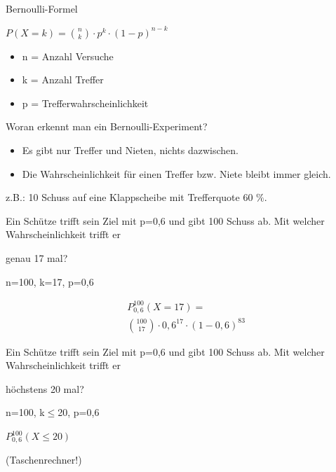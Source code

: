 \documentclass[paper=a6,landscape,ngerman,twoside=true,fontsize=12pt]{scrartcl}
\begin{document}
\begin{frage}
	Bernoulli-Formel
	
\end{frage}
\begin{antwort}
	\LARGE
	$P(X=k)=\binom{n}{k} \cdot p^k \cdot (1-p)^{n-k}$
	\large
	\begin{itemize}
		\item n = Anzahl Versuche
		\item k = Anzahl Treffer
		\item p = Trefferwahrscheinlichkeit
	\end{itemize}	
\end{antwort}
\begin{frage}
	Woran erkennt man ein Bernoulli-Experiment?
	
\end{frage}
\begin{antwort}
	\begin{itemize}
		\item Es gibt nur Treffer und Nieten, nichts dazwischen.
		\item Die Wahrscheinlichkeit für einen Treffer bzw. Niete bleibt immer gleich.
	\end{itemize}
	
	z.B.: 10 Schuss auf eine Klappscheibe mit Trefferquote 60 $\%$.
\end{antwort}
\begin{frage}
	\large
	Ein Schütze trifft sein Ziel mit p=0,6 und gibt 100 Schuss ab. Mit welcher Wahrscheinlichkeit trifft er 
	
	\LARGE 
	genau 17 mal?
	
\end{frage}
\begin{antwort}
	n=100, k=17, p=0,6
	
	\bigskip
	\begin{align*}
	&P^{100}_{0,6}(X=17)= 
	\\&\binom{100}{17} \cdot 0,6^{17}
	\cdot (1-0,6)^{83}
	\end{align*}
	
\end{antwort}
\begin{frage}
	\large
	Ein Schütze trifft sein Ziel mit p=0,6 und gibt 100 Schuss ab. Mit welcher Wahrscheinlichkeit trifft er 
	
	\LARGE 
	höchstens 20 mal?
	
\end{frage}
\begin{antwort}
	n=100, k$\leq$20, p=0,6
	
	\bigskip
	$P^{100}_{0,6}(X\leq 20)$
	
	(Taschenrechner!)
	
\end{antwort}
\end{document}

